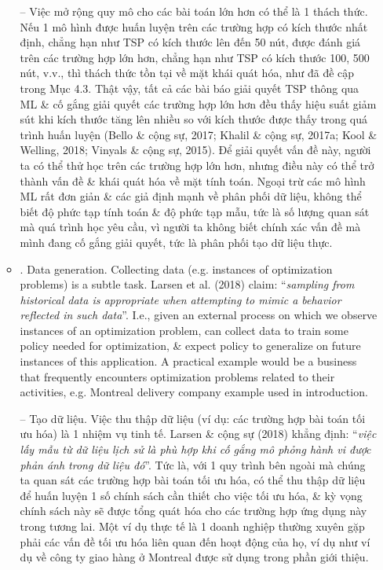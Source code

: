 \documentclass{article}
\begin{document}
\begin{itemize}
\begin{itemize}
        -- Việc mở rộng quy mô cho các bài toán lớn hơn có thể là 1 thách thức. Nếu 1 mô hình được huấn luyện trên các trường hợp có kích thước nhất định, chẳng hạn như TSP có kích thước lên đến 50 nút, được đánh giá trên các trường hợp lớn hơn, chẳng hạn như TSP có kích thước 100, 500 nút, v.v., thì thách thức tồn tại về mặt khái quát hóa, như đã đề cập trong Mục 4.3. Thật vậy, tất cả các bài báo giải quyết TSP thông qua ML \& cố gắng giải quyết các trường hợp lớn hơn đều thấy hiệu suất giảm sút khi kích thước tăng lên nhiều so với kích thước được thấy trong quá trình huấn luyện (Bello \& cộng sự, 2017; Khalil \& cộng sự, 2017a; Kool \& Welling, 2018; Vinyals \& cộng sự, 2015). Để giải quyết vấn đề này, người ta có thể thử học trên các trường hợp lớn hơn, nhưng điều này có thể trở thành vấn đề \& khái quát hóa về mặt tính toán. Ngoại trừ các mô hình ML rất đơn giản \& các giả định mạnh về phân phối dữ liệu, không thể biết độ phức tạp tính toán \& độ phức tạp mẫu, tức là số lượng quan sát mà quá trình học yêu cầu, vì người ta không biết chính xác vấn đề mà mình đang cố gắng giải quyết, tức là phân phối tạo dữ liệu thực.
        \item {. Data generation.} Collecting data (e.g. instances of optimization problems) is a subtle task. Larsen et al. (2018) claim: ``{\it sampling from historical data is appropriate when attempting to mimic a behavior reflected in such data}''. I.e., given an external process on which we observe instances of an optimization problem, can collect data to train some policy needed for optimization, \& expect policy to generalize on future instances of this application. A practical example would be a business that frequently encounters optimization problems related to their activities, e.g. Montreal delivery company example used in introduction.

        -- {\sf Tạo dữ liệu.} Việc thu thập dữ liệu (ví dụ: các trường hợp bài toán tối ưu hóa) là 1 nhiệm vụ tinh tế. Larsen \& cộng sự (2018) khẳng định: ``{\it việc lấy mẫu từ dữ liệu lịch sử là phù hợp khi cố gắng mô phỏng hành vi được phản ánh trong dữ liệu đó}''. Tức là, với 1 quy trình bên ngoài mà chúng ta quan sát các trường hợp bài toán tối ưu hóa, có thể thu thập dữ liệu để huấn luyện 1 số chính sách cần thiết cho việc tối ưu hóa, \& kỳ vọng chính sách này sẽ được tổng quát hóa cho các trường hợp ứng dụng này trong tương lai. Một ví dụ thực tế là 1 doanh nghiệp thường xuyên gặp phải các vấn đề tối ưu hóa liên quan đến hoạt động của họ, ví dụ như ví dụ về công ty giao hàng ở Montreal được sử dụng trong phần giới thiệu.


\end{itemize}
\end{itemize}
\end{document}
